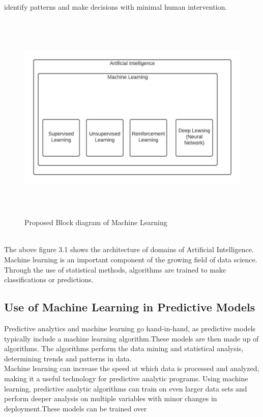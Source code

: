 \documentclass[openany,12pt]{report}
\begin{document}
identify patterns and make decisions with minimal human intervention.
\begin{figure}[H]
\centering
\includegraphics[width=5in,height=4in]{./MachineLearning.jpeg}
\caption{Proposed Block diagram of Machine Learning}
\end{figure}
\\
The above figure 3.1 shows the architecture of domains of Artificial Intelligence.\\
Machine learning is an important component of the growing field of data science. Through the use of statistical methods, algorithms are trained to make classifications or predictions.
\subsection{Use of Machine Learning in Predictive Models}
Predictive analytics and machine learning go hand-in-hand, as predictive models typically include a machine learning algorithm.These models are then made up of algorithms. The algorithms perform the data mining and statistical analysis, determining trends and patterns in data.
\\
Machine learning can increase the speed at which data is processed and analyzed, making it a useful technology for predictive analytic programs. Using machine learning, predictive analytic algorithms can train on even larger data sets and perform deeper analysis on multiple variables with minor changes in deployment.These models can be trained over 
\end{document}
